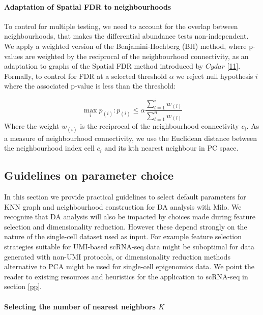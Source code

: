 \documentclass[
]{article}
\begin{document}
\hypertarget{adaptation-of-spatial-fdr-to-neighbourhoods}{%
\paragraph*{Adaptation of Spatial FDR to neighbourhoods}\label{adaptation-of-spatial-fdr-to-neighbourhoods}}

To control for multiple testing, we need to account for the overlap between neighbourhoods, that makes the differential abundance tests non-independent. We apply a weighted version of the Benjamini-Hochberg (BH) method, where p-values are weighted by the reciprocal of the neighbourhood connectivity, as an adaptation to graphs of the Spatial FDR method introduced by \(Cydar\) {[}\protect\hyperlink{ref-lunTestingDifferentialAbundance2017}{11}{]}.
Formally, to control for FDR at a selected threshold \(\alpha\) we reject null hypothesis \(i\) where the associated p-value is less than the threshold:

\[
\max_i{p_{(i)}: p_{(i)}\le \alpha\frac{\sum_{l=1}^{i}w_{(l)}}{\sum_{l=1}^{n}w_{(l)}}}
\]
Where the weight \(w_{(i)}\) is the reciprocal of the neighbourhood connectivity \(c_i\). As a measure of neighbourhood connectivity, we use the Euclidean distance between the neighbourhood index cell \(c_i\) and its kth nearest neighbour in PC space.

\hypertarget{guidelines-on-parameter-choice}{%
\subsection{Guidelines on parameter choice}\label{guidelines-on-parameter-choice}}

In this section we provide practical guidelines to select default parameters for KNN graph and neighbourhood construction for DA analysis with Milo. We recognize that DA analysis will also be impacted by choices made during feature selection and dimensionality reduction. However these depend strongly on the nature of the single-cell dataset used as input. For example feature selection strategies suitable for UMI-based scRNA-seq data might be suboptimal for data generated with non-UMI protocols, or dimensionality reduction methods alternative to PCA might be used for single-cell epigenomics data. We point the reader to existing resources and heuristics for the application to scRNA-seq in section \ref{pp}.

\hypertarget{selecting-the-number-of-nearest-neighbors-k}{%
\paragraph*{\texorpdfstring{Selecting the number of nearest neighbors \(K\)}{Selecting the number of nearest neighbors K}}\label{selecting-the-number-of-nearest-neighbors-k}}
\end{document}
